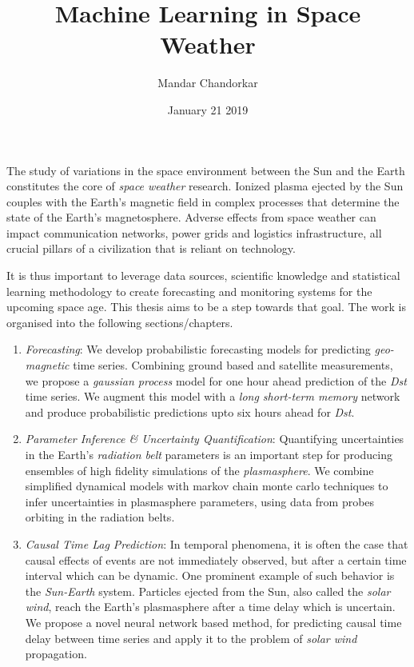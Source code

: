 \documentclass[10pt]{article}
\title{Machine Learning in Space Weather}
\author{Mandar Chandorkar}
\date{January 21 2019}
\begin{document}
\maketitle

The study of variations in the space environment between the Sun and the Earth constitutes the core of \textit{space weather} research. Ionized plasma ejected by the Sun couples with the Earth’s magnetic field in complex processes that determine the state of the Earth's magnetosphere. Adverse effects from space weather can impact communication networks, power grids and logistics infrastructure, all crucial pillars of a civilization that is reliant on technology.

It is thus important to leverage data sources, scientific knowledge and statistical learning methodology to create forecasting and monitoring systems for the upcoming space age. This thesis aims to be a step towards that goal. The work is organised into the following sections/chapters.

\begin{enumerate}
\item \textit{Forecasting}: We develop probabilistic forecasting models for predicting \textit{geo-magnetic} time series. Combining ground based and satellite measurements, we propose a \textit{gaussian process} model for one hour ahead prediction of the \textit{Dst} time series. We augment this model with a \textit{long short-term memory} network and produce probabilistic predictions upto six hours ahead for \textit{Dst}.

\item \textit{Parameter Inference \& Uncertainty Quantification}: Quantifying uncertainties in the Earth's \textit{radiation belt} parameters is an important step for producing ensembles of high fidelity simulations of the \textit{plasmasphere}. We combine simplified dynamical models with markov chain monte carlo techniques to infer uncertainties in plasmasphere parameters, using data from probes orbiting in the radiation belts.

\item \textit{Causal Time Lag Prediction}: In temporal phenomena, it is often the case that causal effects of events are not immediately observed, but after a certain time interval which can be dynamic. One prominent example of such behavior is the \textit{Sun-Earth} system. Particles ejected from the Sun, also called the \textit{solar wind}, reach the Earth's plasmasphere after a time delay which is uncertain. We propose a novel neural network based method, for predicting causal time delay between time series and apply it to the problem of \textit{solar wind} propagation.



\end{enumerate}






\end{document}
